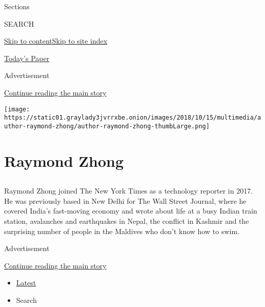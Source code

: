 Sections

SEARCH

\protect\hyperlink{site-content}{Skip to
content}\protect\hyperlink{site-index}{Skip to site index}

\href{https://myaccount.nytimes3xbfgragh.onion/auth/login?response_type=cookie\&client_id=vi}{}

\href{https://www.nytimes3xbfgragh.onion/section/todayspaper}{Today's
Paper}

Advertisement

\protect\hyperlink{after-top}{Continue reading the main story}

\texttt{[image: https://static01.graylady3jvrrxbe.onion/images/2018/10/15/multimedia/author-raymond-zhong/author-raymond-zhong-thumbLarge.png]}

\hypertarget{raymond-zhong}{%
\section{Raymond Zhong}\label{raymond-zhong}}

\subsection{}

Raymond Zhong joined The New York Times as a technology reporter in
2017. He was previously based in New Delhi for The Wall Street Journal,
where he covered India's fast-moving economy and wrote about life at a
busy Indian train station, avalanches and earthquakes in Nepal, the
conflict in Kashmir and the surprising number of people in the Maldives
who don't know how to swim.~

Advertisement

\protect\hyperlink{after-mid1}{Continue reading the main story}

\begin{itemize}
\tightlist
\item
  \protect\hyperlink{stream-panel}{Latest}
\item
  Search
\end{itemize}

